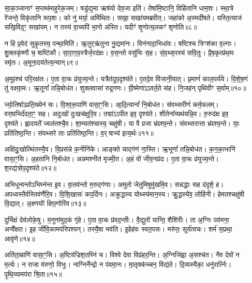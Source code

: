 सा॒क॒ञ्जानाꣳ॑ स॒प्तथ॑माहुरेक॒जम्। षडु॑द्य॒मा ऋष॑यो देव॒जा इति॑। 
तेषा॑मि॒ष्टानि॒ विहि॑तानि धाम॒शः। स्था॒त्रे रे॑जन्ते॒ विकृ॑तानि रूप॒शः। 
को नु॑ मर्या॒ अमि॑थितः। सखा॒ सखा॑यमब्रवीत्। 
जहा॑को अ॒स्मदी॑षते। यस्ति॒त्याज॑ सखि॒विद॒ꣳ॒ सखा॑यम्। 
न तस्य॑ वा॒च्यपि॑ भा॒गो अ॑स्ति। यदीꣳ॑ शृ॒णोत्य॒लकꣳ॑ शृणोति॥८॥

न हि प्र॒वेद॑ सुकृ॒तस्य॒ पन्था॒मिति॑। ऋ॒तुर्‌ऋ॑तुना नु॒द्यमा॑नः। 
विन॑नादा॒\-भिधा॑वः। षष्टिश्च त्रिꣳश॑का व॒ल्गाः। 
शु॒क्लकृ॑ष्णौ च॒ षाष्टि॑कौ। सा॒रा॒ग॒व॒स्त्रैर्ज॒र\-द॑क्षः। 
व॒स॒न्तो वसु॑भिः स॒ह। सं॒व॒थ्स॒रस्य॑ सवि॒तुः। 
प्रै॒ष॒कृत्प्र॑थ॒मः स्मृ॑तः। अ॒मूना॒दय॑तेत्य॒न्यान्॥९॥

अ॒मूꣴश्च॑ परि॒रक्ष॑तः। ए॒ता वा॒चः प्र॑युज्य॒न्ते। 
यत्रैत॑दुप॒दृश्य॑ते। ए॒तदे॒व वि॑जानी॒यात्। 
प्र॒माणं॑ काल॒पर्य॑ये। वि॒शे॒ष॒णं तु॑ वक्ष्या॒मः। 
ऋ॒तूनां᳚ तन्नि॒बोध॑त। शुक्लवासा॑ रुद्र॒गणः। 
ग्री॒ष्मेणा॑ऽऽवर्त॒ते स॑ह। नि॒जह॑न्‌ पृथि॑वीꣳ स॒र्वाम्॥१०॥

ज्यो॒तिषा᳚ऽप्रति॒ख्येन॑ सः। वि॒श्व॒रू॒पाणि॑ वासा॒ꣳ॒सि। 
आ॒दि॒त्यानां᳚ नि॒बोध॑त। संवथ्सरीणं॑ कर्म॒फलम्। 
वर्‌षाभिर्द॑दता॒ꣳ॒ सह। अदुःखो॑ दुःखच॑क्षुरि॒व। 
तद्मा॑ऽऽपीत इव॒ दृश्य॑ते। शीतेना᳚व्यथ॑यन्नि॒व। 
रु॒रुद॑क्ष इव॒ दृश्य॑ते। ह्लादयते᳚ ज्वल॑तश्चै॒व। 
शा॒म्यत॑श्चास्य॒ चक्षु॑षी। या वै प्रजा भ्र॑ꣴश्य॒न्ते। 
संवथ्सरात्ता भ्र॑ꣴश्य॒न्ते। याः॒ प्रति॑तिष्ठ॒न्ति। 
संवथ्सरे ताः प्रति॑तिष्ठ॒न्ति। व॒र्‌षाभ्य॑ इत्य॒र्थः॥११॥\anuvakamend


अक्षि॑दुः॒खोत्थि॑तस्यै॒व। वि॒प्रस॑न्ने क॒नीनि॑के। 
आङ्क्ते चाद्ग॑णं ना॒स्ति। ऋ॒भूणां᳚ तन्नि॒बोध॑त। 
क॒न॒का॒भानि॑ वासा॒ꣳ॒सि। अ॒हता॑नि नि॒बोध॑त। 
अन्नमश्नीत॑ मृज्मी॒त। अ॒हं वो॑ जीव॒नप्र॑दः। 
ए॒ता वा॒चः प्र॑युज्य॒न्ते। श॒रद्य॑त्रोप॒दृश्य॑ते॥१२॥

अभिधून्वन्तोऽभिघ्न॑न्त इ॒व। वा॒तव॑न्तो म॒रुद्ग॑णाः। 
अमुतो जेतुमिषुमु॑खमि॒व। सन्नद्धाः सह द॑दृशे॒ ह। 
अपध्वस्तैर्वस्तिव॑र्णैरि॒व। वि॒शि॒खासः॑ कप॒र्दिनः। 
अक्रुद्धस्य योथ्स्य॑मान॒स्य। क्रु॒द्धस्ये॑व॒ लोहि॑नी। 
हेमतश्चक्षु॑षी वि॒द्यात्। अ॒क्ष्णयोः᳚ क्षिप॒णोरि॑व॥१३॥

दुर्भिक्षं देव॑लोके॒षु। म॒नूना॑मुद॒कं गृ॑हे। 
ए॒ता वा॒चः प्र॑वद॒न्तीः। वै॒द्युतो॑ यान्ति॒ शैशि॑रीः। 
ता अ॒ग्निः पव॑मना॒ अन्वै᳚क्षत। इ॒ह जी॑वि॒कामप॑रिपश्यन्। 
तस्यै॒षा भव॑ति। इ॒हेह॑वः स्वत॒पसः। 
मरु॑तः॒ सूर्य॑त्वचः। शर्म॑ स॒प्रथा॒ आवृ॑णे॥१४॥\anuvakamend


अति॑ता॒म्राणि॑ वासा॒ꣳ॒सि। अ॒ष्टिव॑ज्रिश॒तघ्नि॑ च। 
विश्वे देवा विप्र॑हर॒न्ति। अ॒ग्निजि॑ह्वा अ॒सश्च॑त। 
नैव देवो॑ न म॒र्त्यः। न राजा व॑रुणो॒ विभुः। 
नाग्निर्नेन्द्रो न प॑वमा॒नः। मा॒तृक्क॑च्चन॒ विद्य॑ते। 
दि॒व्यस्यैका॒ धनु॑रार्त्निः। पृ॒थि॒व्यामप॑रा श्रि॒ता॥१५॥

